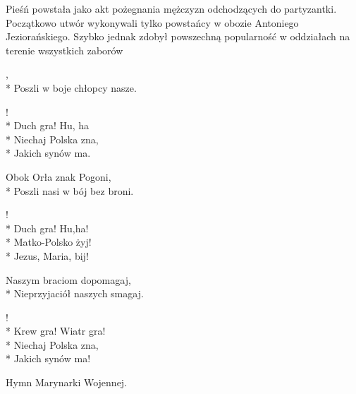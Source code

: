 \begin{info}Pieśń powstała jako akt pożegnania mężczyzn odchodzących do partyzantki. Początkowo utwór wykonywali tylko powstańcy w obozie Antoniego Jeziorańskiego. Szybko jednak zdobył powszechną popularność w oddziałach na terenie wszystkich zaborów\end{info}

\begin{lyrics}[longestline={W krwawym polu srebrne ptaszę,}]

,\\*
Poszli w boje chłopcy nasze.

\begin{chorus}
!\\*
Duch gra! Hu, ha\\*
Niechaj Polska zna,\\*
Jakich synów ma.
\end{chorus}

Obok Orła znak Pogoni,\\*
Poszli nasi w bój bez broni.

\begin{chorus}
!\\*
Duch gra! Hu,ha!\\*
Matko-Polsko żyj!\\*
Jezus, Maria, bij!
\end{chorus}

Naszym braciom dopomagaj,\\*
Nieprzyjaciół naszych smagaj.

\begin{chorus}
!\\*
Krew gra! Wiatr gra!\\*
Niechaj Polska zna,\\*
Jakich synów ma!
\end{chorus}
\end{lyrics}



\begin{info}Hymn Marynarki Wojennej.\end{info}

